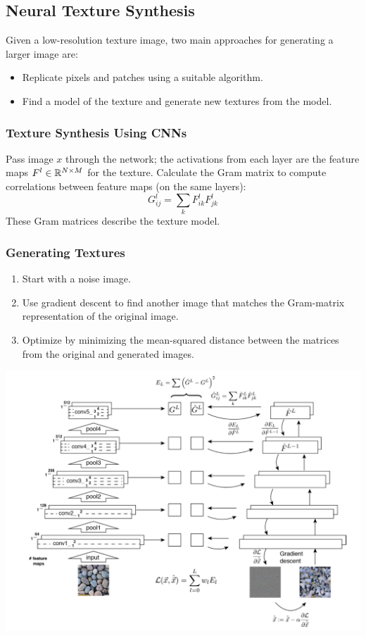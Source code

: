 \subsection{Neural Texture Synthesis}
Given a low-resolution texture image, two main approaches for generating a larger image are:
\begin{itemize}
	\item Replicate pixels and patches using a suitable algorithm.
	\item Find a model of the texture and generate new textures from the model.
\end{itemize}

\subsubsection{Texture Synthesis Using CNNs}
Pass image $x$ through the network; the activations from each layer are the feature maps $F^l \in \mathbb{R}^{N\times M}$ for the texture.
Calculate the Gram matrix to compute correlations between feature maps (on the same layers):
\begin{equation*}
	G_{ij}^l = \sum_{k} F_{ik}^l F_{jk}^l
\end{equation*}
These Gram matrices describe the texture model.

\subsubsection{Generating Textures}
\begin{enumerate}
	\item Start with a noise image.
	\item Use gradient descent to find another image that matches the Gram-matrix representation of the original image.
	\item Optimize by minimizing the mean-squared distance between the matrices from the original and generated images.
\end{enumerate}

\begin{center}
	\includegraphics[width=0.8\linewidth]{img/conditional_GAN_texture_generation}
\end{center}

